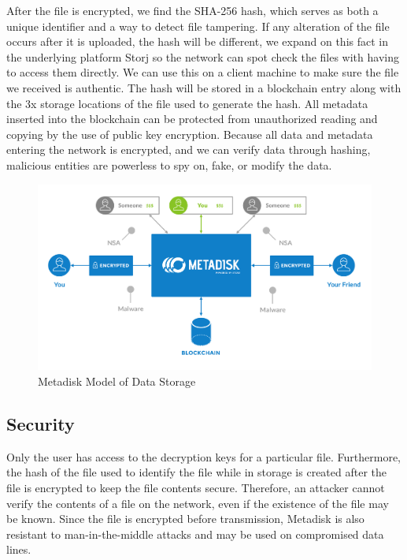 \documentclass[a4paper,10pt]{article}
\begin{document}
After the file is encrypted, we find the SHA-256 hash, which serves as both a unique identifier and a way to detect file tampering.  If any alteration of the file occurs after it is uploaded, the hash will be different, we expand on this fact in the underlying platform Storj \cite{7} so the network can spot check the files with having to access them directly. We can use this on a client machine to make sure the file we received is authentic. The hash will be stored in a blockchain entry along with the 3x storage locations of the file used to generate the hash.  All metadata inserted into the blockchain can be protected from unauthorized reading and copying by the use of public key encryption.  Because all data and metadata entering the network is encrypted, and we can verify data through hashing, malicious entities are powerless to spy on, fake, or modify the data.

\begin{figure}[h!]
  \centering
      \includegraphics[width=\linewidth]{02}
  \caption{Metadisk Model of Data Storage}
\end{figure}

\subsection*{Security}

Only the user has access to the decryption keys for a particular file. Furthermore, the hash of the file used to identify the file while in storage is created after the file is encrypted to keep the file contents secure. Therefore, an attacker cannot verify the contents of a file on the network, even if the existence of the file may be known. Since the file is encrypted before transmission, Metadisk is also resistant to man-in-the-middle attacks and may be used on compromised data lines.   \\
\end{document}
